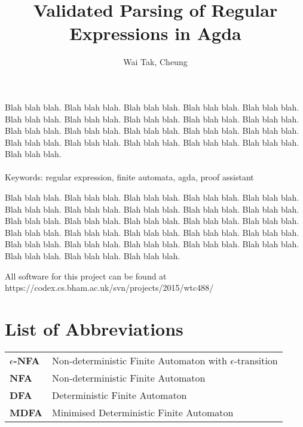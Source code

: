 \documentclass[twoside,openright,final]{bhamthesis}
\title{\textbf{Validated Parsing of Regular Expressions in Agda}}
\author{Wai Tak, Cheung}
\begin{document}
\maketitle

\abstract
\par Blah blah blah. Blah blah blah. Blah blah blah. Blah blah blah. Blah
blah blah. Blah blah blah. Blah blah blah. Blah blah blah.
Blah blah blah. Blah blah blah. Blah blah blah. Blah blah blah. Blah
blah blah.
Blah blah blah. Blah blah blah. Blah blah blah. Blah blah blah.
Blah blah blah. Blah blah blah. Blah blah blah. Blah blah blah. \\ \\
Keywords: regular expression, finite automata, agda, proof assistant

\acknowledgments
\par Blah blah blah. Blah blah blah. Blah blah blah. Blah blah blah. Blah
blah blah. Blah blah blah. Blah blah blah.
Blah blah blah. Blah blah blah. Blah blah blah.
Blah blah blah. Blah blah blah. Blah blah blah. Blah blah blah. Blah
blah blah. Blah blah blah. Blah blah blah.
Blah blah blah. Blah blah blah. Blah blah blah. Blah blah blah. Blah
blah blah. Blah blah blah.
Blah blah blah. Blah blah blah. Blah blah blah. Blah blah blah. Blah
blah blah.

\repository
\vspace{7cm}
\begin{center}
  All software for this project can be found at \\
  https://codex.cs.bham.ac.uk/svn/projects/2015/wtc488/
\end{center}

\newpage
\section*{List of Abbreviations}
\begin{tabular}{ll}
  \textbf{\(\epsilon\)-NFA} & Non-deterministic Finite Automaton with
                              \(\epsilon\)-transition \\
  \textbf{NFA} & Non-deterministic Finite Automaton \\
  \textbf{DFA} & Deterministic Finite Automaton \\
  \textbf{MDFA} & Minimised Deterministic Finite Automaton
\end{tabular}
\newpage

\newpage
\setcounter{tocdepth}{3}
\tableofcontents
\end{document}

